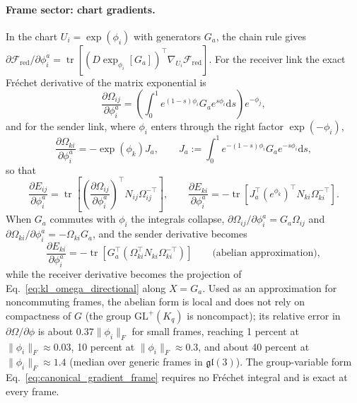 \paragraph{Frame sector: chart gradients.}
In the chart $U_i = \exp(\phi_i)$ with generators $G_a$, the chain rule gives $\partial\mathcal{F}_{\mathrm{red}}/\partial\phi_i^a = \operatorname{tr}[(D\exp_{\phi_i}[G_a])^\top\nabla_{U_i}\mathcal{F}_{\mathrm{red}}]$. For the receiver link the exact Fr\'echet derivative of the matrix exponential is
\begin{equation}
\frac{\partial \Omega_{ij}}{\partial \phi_i^a} = \left(\int_0^1 e^{(1-s)\phi_i} G_a e^{s\phi_i} \mathrm{d}s\right) e^{-\phi_j},
\label{eq:frechet_dexp}
\end{equation}
and for the sender link, where $\phi_i$ enters through the right factor $\exp(-\phi_i)$,
\begin{equation}
\frac{\partial \Omega_{ki}}{\partial \phi_i^a} = -\exp(\phi_k)J_a,
\qquad
J_a := \int_0^1 e^{-(1-s)\phi_i} G_a e^{-s\phi_i} \mathrm{d}s,
\label{eq:frechet_dexp_sender}
\end{equation}
so that
\begin{equation}
\frac{\partial E_{ij}}{\partial \phi_i^a} = \operatorname{tr}\left[\left(\frac{\partial \Omega_{ij}}{\partial \phi_i^a}\right)^\top N_{ij}\Omega_{ij}^{-\top}\right],
\qquad
\frac{\partial E_{ki}}{\partial \phi_i^a} = -\operatorname{tr}\left[J_a^\top (e^{\phi_k})^\top N_{ki}\Omega_{ki}^{-\top}\right].
\end{equation}
When $G_a$ commutes with $\phi_i$ the integrals collapse, $\partial \Omega_{ij}/\partial \phi_i^a = G_a \Omega_{ij}$ and $\partial \Omega_{ki}/\partial \phi_i^a = -\Omega_{ki} G_a$, and the sender derivative becomes
\begin{equation}
\frac{\partial E_{ki}}{\partial \phi_i^a} = -\operatorname{tr}\left[G_a^\top\left(\Omega_{ki}^\top N_{ki} \Omega_{ki}^{-\top}\right)\right] \qquad \text{(abelian approximation)},
\label{eq:sender_phi_gradient}
\end{equation}
while the receiver derivative becomes the projection of Eq.~\eqref{eq:kl_omega_directional} along $X = G_a$. Used as an approximation for noncommuting frames, the abelian form is local and does not rely on compactness of $G$ (the group $\mathrm{GL}^+(K_q)$ is noncompact); its relative error in $\partial\Omega/\partial\phi$ is about $0.37\|\phi_i\|_F$ for small frames, reaching 1 percent at $\|\phi_i\|_F \approx 0.03$, 10 percent at $\|\phi_i\|_F \approx 0.3$, and about 40 percent at $\|\phi_i\|_F \approx 1.4$ (median over generic frames in $\mathfrak{gl}(3)$). The group-variable form Eq.~\eqref{eq:canonical_gradient_frame} requires no Fr\'echet integral and is exact at every frame.

